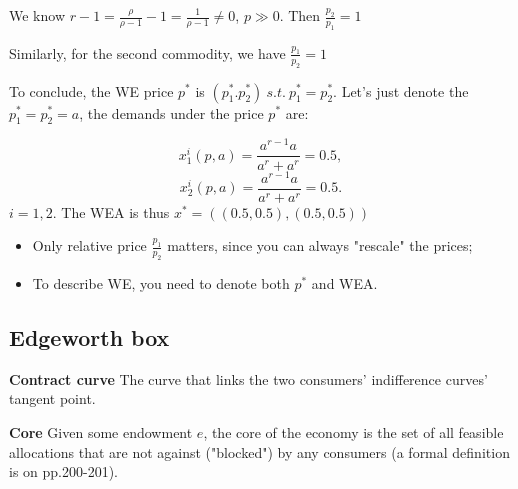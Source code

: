 \documentclass{article}
\begin{document}
We know $r-1 = \frac{\rho}{\rho-1} -1 = \frac{1}{\rho-1} \ne 0$, $p \gg 0$. Then $\frac{p_2}{p_1} = 1$

Similarly, for the second commodity, we have  $\frac{p_1}{p_2} = 1$

To conclude, the WE price $p^*$ is $(p^*_1.p^*_2) \ s.t.\ p^*_1=p^*_2$. Let's just denote the $p^*_1=p^*_2 = a$, the demands under the price $p^*$ are:

$$x^i_1(p,a) = \frac{a^{r-1} a}{a^r+a^r} = 0.5 ,$$
$$x^i_2(p,a) = \frac{a^{r-1} a}{a^r+a^r} = 0.5.$$
$i = 1,2$. The WEA is thus $x^* = ((0.5,0.5),(0.5,0.5))$
\begin{mdframed}[backgroundcolor=blue!20,linecolor=white]

\begin{itemize}
\item Only relative price $\frac{p_1}{p_2}$ matters, since you can always "rescale" the prices;
\item To describe WE, you need to denote both $p^*$ and WEA.
\end{itemize}
\end{mdframed}



\subsection{Edgeworth box}

\begin{mdframed}[backgroundcolor=blue!20,linecolor=white]
\textbf{Contract curve} The curve that links the two consumers' indifference curves' tangent point.

\textbf{Core} Given some endowment $e$, the core of the economy is the set of all feasible allocations that are not against ("blocked") by any consumers (a formal definition is on pp.200-201).

\begin{center}
\label{fig:c1}
\end{center}
\end{mdframed}
\end{document}
